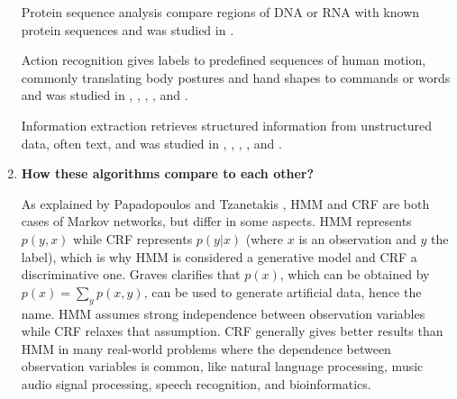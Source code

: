\begin{enumerate}[itemindent=\parindent,label=\textbf{RQ\arabic*.}]
    Protein sequence analysis
    compare regions of DNA or RNA with known protein sequences
    and was studied in 
    \cite{dafe2015learning}.
    
    Action recognition
    gives labels to predefined sequences of human motion, commonly translating body postures and hand shapes to commands or words
    and was studied in 
    \cite{6247918},
    \cite{Chatzis20131523},
    \cite{6213103},
    \cite{Liu20173671}, and
    \cite{Fang:2017:DEU:3131672.3131693}.  
    
    Information extraction
    retrieves structured information from unstructured data, often text,
    and was studied in 
    \cite{Cuong:2014:CRF:2627435.2638567},
    \cite{Irsoy2014720},
    \cite{nguyen2018recurrent},
    \cite{feng2018attention}, and
    \cite{dafe2015learning}.
    

\item   \textbf{How these algorithms compare to each other?}

    
    As explained by Papadopoulos and Tzanetakis \cite{7579173}, HMM and CRF are both cases of Markov networks, but differ in some aspects.
        HMM represents $p(y,x)$ while CRF represents $p(y|x)$ (where $x$ is an observation and $y$ the label), which is why HMM is considered a generative model and CRF a discriminative one.
        Graves \cite{gravessupervised} clarifies that $p(x)$, which can be obtained by $p(x) = \sum_{y} p(x,y)$, can be used to generate artificial data, hence the name.
        HMM assumes strong independence between observation variables while CRF relaxes that assumption.
        CRF generally gives better results than HMM in many real-world problems where the dependence between observation variables is common, like natural language processing, music audio signal processing, speech recognition, and bioinformatics.
        

\end{enumerate}
